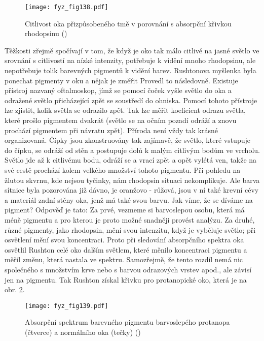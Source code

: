     \begin{figure}[ht!]  %
      \centering
      \texttt{[image: fyz\_fig138.pdf]}
      \caption{Citlivost oka přizpůsobeného tmě v porovnání s absorpční křivkou rhodopsinu
              (\cite[s.~478]{Feynman01})}
      \label{fyz:fig138}
    \end{figure} 

    Těžkosti zřejmě spočívají v tom, že když je oko tak málo citlivé na jasné světlo ve srovnání s 
    citlivostí na nízké intenzity, potřebuje k vidění mnoho rhodopsinu, ale nepotřebuje tolik 
    barevných pigmentů k vidění barev. Rushtonova myšlenka byla ponechat pigmenty v oku a nějak je 
    změřit Provedl to následovně. Existuje přístroj nazvaný oftalmoskop, jímž se pomocí čoček vyšle 
    světlo do oka a odražené světlo přicházející zpět se soustředí do ohniska. Pomocí tohoto 
    přístroje lze zjistit, kolik světla se odrazilo zpět. Tak lze měřit koeficient odrazu světla, 
    které prošlo pigmentem dvakrát (světlo se na očním pozadí odráží a znovu prochází pigmentem 
    při návratu zpět). Příroda není vždy tak krásné organizovaná. Čípky jsou zkonstruovány tak 
    zajímavě, že světlo, které vstupuje do čípku, se odráží od stěn a postupuje dolů k malým 
    citlivým bodům ve vrcholu. Světlo jde až k citlivému bodu, odráží se a vrací zpět a opět vylétá 
    ven, takže na své cestě prochází kolem velkého množství tohoto pigmentu. Při pohledu na žlutou 
    skvrnu, kde nejsou tyčinky, nám rhodopsin situaci nekomplikuje. Ale barva sítnice byla 
    pozorována již dávno, je oranžovo - růžová, jsou v ní také krevní cévy a materiál zadní stěny 
    oka, jenž má také svou barvu. Jak víme, že se díváme na pigment? Odpověď je tato: Za prvé, 
    vezmeme si barvoslepou osobu, která má méně pigmentu a pro kterou je proto možné snadněji 
    provést analýzu. Za druhé, různé pigmenty, jako rhodopsin, mění svou intenzitu, když je 
    vyběluje světlo; při osvětlení mění svou koncentraci. Proto při sledování absorpčního spektra 
    oka osvětlil Rushton celé oko dalším světlem, které měnilo koncentraci pigmentu a měřil změnu, 
    která nastala ve spektru. Samozřejmě, že tento rozdíl nemá nic společného s množstvím krve nebo 
    s barvou odrazových vrstev apod., ale závisí jen na pigmentu. Tak Rushton získal křivku pro 
    protanopické oko, která je na obr. \ref{fyz:fig139}.

    \begin{figure}[ht!]  %
      \centering
      \texttt{[image: fyz\_fig139.pdf]}
      \caption{Absorpční spektrum barevného pigmentu barvoslepého protanopa (čtverce) a normálního 
               oka (tečky)
              (\cite[s.~479]{Feynman01})}
      \label{fyz:fig139}
    \end{figure} 
    
